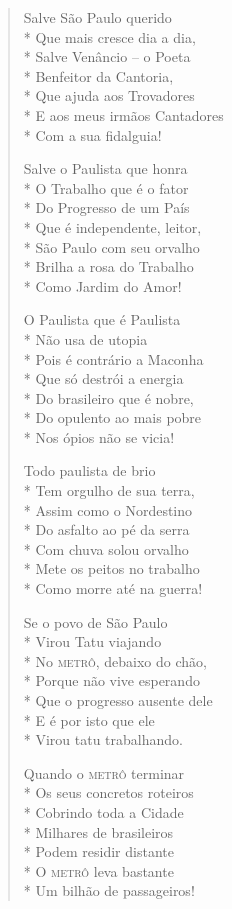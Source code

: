 \begin{verse}
Salve São Paulo querido\\*
Que mais cresce dia a dia,\\*
Salve Venâncio --  o Poeta\\*
Benfeitor da Cantoria,\\*
Que ajuda aos Trovadores\\*
E aos meus irmãos Cantadores\\*
Com a sua fidalguia!

Salve o Paulista que honra\\*
O Trabalho que é o fator\\*
Do Progresso de um País\\*
Que é independente, leitor,\\*
São Paulo com seu orvalho\\*
Brilha a rosa do Trabalho\\*
Como Jardim do Amor!

O Paulista que é Paulista\\*
Não usa de utopia\\*
Pois é contrário a Maconha\\*
Que só destrói a energia\\*
Do brasileiro que é nobre,\\*
Do opulento ao mais pobre\\*
Nos ópios não se vicia!

Todo paulista de brio\\*
Tem orgulho de sua terra,\\*
Assim como o Nordestino\\*
Do asfalto ao pé da serra\\*
Com chuva solou orvalho\\*
Mete os peitos no trabalho\\*
Como morre até na guerra!

Se o povo de São Paulo\\*
Virou Tatu viajando\\*
No \textsc{metrô}, debaixo do chão,\\*
Porque não vive esperando\\*
Que o progresso ausente dele\\*
E é por isto que ele\\*
Virou tatu trabalhando.

Quando o \textsc{metrô} terminar\\*
Os seus concretos roteiros\\*
Cobrindo toda a Cidade\\*
Milhares de brasileiros\\*
Podem residir distante\\*
O \textsc{metrô} leva bastante\\*
Um bilhão de passageiros!


\end{verse}
